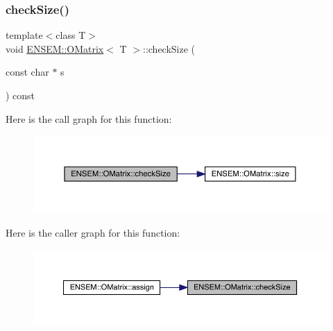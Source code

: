 \subsubsection{\texorpdfstring{checkSize()}{checkSize()}\hspace{0.1cm}{\footnotesize\ttfamily [1/4]}}
{\footnotesize\ttfamily template$<$class T$>$ \\
void \mbox{\hyperlink{classENSEM_1_1OMatrix}{E\+N\+S\+E\+M\+::\+O\+Matrix}}$<$ T $>$\+::check\+Size (\begin{DoxyParamCaption}\item[{const char $\ast$}]{s }\end{DoxyParamCaption}) const\hspace{0.3cm}{\ttfamily [inline]}}

Here is the call graph for this function\+:
\nopagebreak
\begin{figure}[H]
\begin{center}
\leavevmode
\includegraphics[width=350pt]{dd/d80/classENSEM_1_1OMatrix_abec80929ab7e8e2a23822fbbc841bd87_cgraph}
\end{center}
\end{figure}
Here is the caller graph for this function\+:\nopagebreak
\begin{figure}[H]
\begin{center}
\leavevmode
\includegraphics[width=350pt]{dd/d80/classENSEM_1_1OMatrix_abec80929ab7e8e2a23822fbbc841bd87_icgraph}
\end{center}
\end{figure}
\mbox{\label{classENSEM_1_1OMatrix_abec80929ab7e8e2a23822fbbc841bd87}} 
